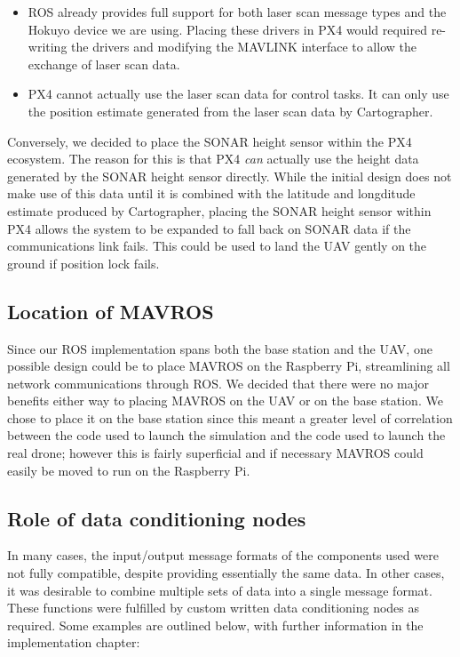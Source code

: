 \documentclass[capstone_report.tex]{subfiles}
\begin{document}
\begin{itemize}
	\item ROS already provides full support for both laser scan message types and the Hokuyo device we are using. Placing these drivers in PX4 would required re-writing the drivers and modifying the MAVLINK interface to allow the exchange of laser scan data.
	\item PX4 cannot actually use the laser scan data for control tasks. It can only use the position estimate generated from the laser scan data by Cartographer.
\end{itemize}

Conversely, we decided to place the SONAR height sensor within the PX4 ecosystem. The reason for this is that PX4 \emph{can} actually use the height data generated by the SONAR height sensor directly. While the initial design does not make use of this data until it is combined with the latitude and longditude estimate produced by Cartographer, placing the SONAR height sensor within PX4 allows the system to be expanded to fall back on SONAR data if the communications link fails. This could be used to land the UAV gently on the ground if position lock fails.

\subsection{Location of MAVROS}
Since our ROS implementation spans both the base station and the UAV, one possible design could be to place MAVROS on the Raspberry Pi, streamlining all network communications through ROS. We decided that there were no major benefits either way to placing MAVROS on the UAV or on the base station. We chose to place it on the base station since this meant a greater level of correlation between the code used to launch the simulation and the code used to launch the real drone; however this is fairly superficial and if necessary MAVROS could easily be moved to run on the Raspberry Pi.

\subsection{Role of data conditioning nodes}
In many cases, the input/output message formats of the components used were not fully compatible, despite providing essentially the same data. In other cases, it was desirable to combine multiple sets of data into a single message format. These functions were fulfilled by custom written data conditioning nodes as required. Some examples are outlined below, with further information in the implementation chapter:
\end{document}
